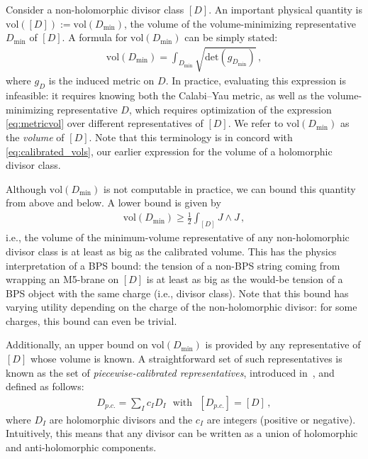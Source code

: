 \documentclass[11pt,dvipsnames]{article}
\theoremstyle{definition}
\begin{document}
Consider a non-holomorphic divisor class $[D]$. An important physical quantity is $\text{vol}([D]) := \text{vol}(D_{\text{min}})$, the volume of the volume-minimizing representative $D_{\text{min}}$ of $[D]$. A formula for $\text{vol}(D_{\text{min}})$ can be simply stated: 
\begin{align}
    \text{vol}(D_{\text{min}}) = \int_{D_{\text{min}}} \sqrt{\text{det}(g_{D_{\text{min}}})}\,,
    \label{eq:metricvol}
\end{align}
where $g_D$ is the induced metric on $D$. In practice, evaluating this expression is infeasible: it requires knowing both the Calabi--Yau metric, as well as the volume-minimizing representative $D$, which requires optimization of the expression \eqref{eq:metricvol} over different representatives of $[D]$. We refer to $\text{vol}(D_{\text{min}})$ as the \textit{volume} of $[D]$. Note that this terminology is in concord with \eqref{eq:calibrated_vols}, our earlier expression for the volume of a holomorphic divisor class.

Although $\text{vol}(D_{\text{min}})$ is not computable in practice, we can bound this quantity from above and below. A lower bound is given by
\begin{align}
    \text{vol}(D_{\text{min}}) \geq \frac{1}{2} \int_{[D]} J \wedge J \,,
\end{align}
i.e., the volume of the minimum-volume representative of any non-holomorphic divisor class is at least as big as the calibrated volume. This has the physics interpretation of a BPS bound: the tension of a non-BPS string coming from wrapping an M5-brane on $[D]$ is at least as big as the would-be tension of a BPS object with the same charge (i.e., divisor class). Note that this bound has varying utility depending on the charge of the non-holomorphic divisor: for some charges, this bound can even be trivial.

Additionally, an upper bound on $\text{vol}(D_{\text{min}})$ is provided by any representative of $[D]$ whose volume is known. A straightforward set of such representatives is known as the set of \textit{piecewise-calibrated representatives}, introduced in~\cite{Demirtas:2019lfi}, and defined as follows:
\begin{align}
    D_{p.c.} = \sum_{I} c_I D_I \ \ \ \text{with} \ \ \ [D_{p.c.}] = [D]\,,
\end{align}
where $D_I$ are holomorphic divisors and the $c_I$ are integers (positive or negative). Intuitively, this means that any divisor can be written as a union of holomorphic and anti-holomorphic components. 
\end{document}
